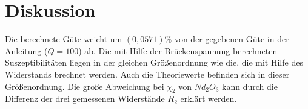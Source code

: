 \section{Diskussion}
\label{sec:Diskussion}

Die berechnete Güte weicht um $(0,0571)\%$ von der gegebenen Güte in der Anleitung ($Q=100$) ab.
Die mit Hilfe der Brückenspannung berechneten Suszeptibilitäten liegen in der gleichen Größenordnung wie die, die mit Hilfe des Widerstands brechnet werden. Auch die Theoriewerte befinden sich in dieser Größenordnung. Die große Abweichung bei $\chi_2$ von $Nd_2 O_3$ kann durch die Differenz der drei gemessenen Widerstände $R_2$ erklärt werden.
